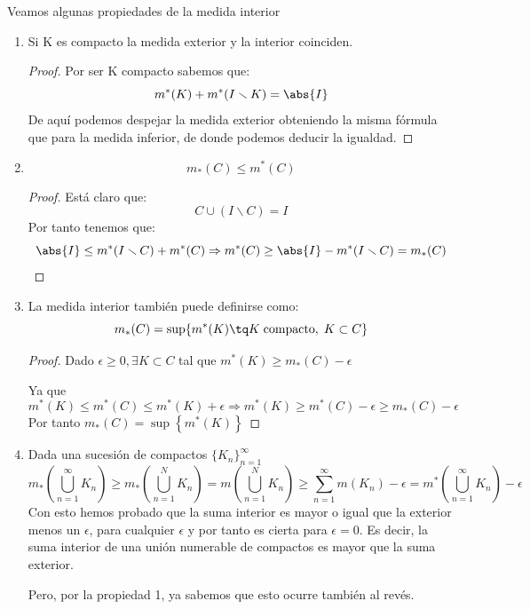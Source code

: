 \documentclass{apuntes}
\begin{document}
Veamos algunas propiedades de la medida interior
\begin{enumerate}
%
\item Si K es compacto la medida exterior y la interior coinciden.
\begin{proof}
Por ser K compacto sabemos que:
\[m^*(K) + m^*(I\smallsetminus K) = \abs{I}\]
De aquí podemos despejar la medida exterior obteniendo la misma fórmula que para la medida inferior, de donde podemos deducir la igualdad.
\end{proof}

%
\item \[m_*(C) \leq m^*(C)\]
\begin{proof}
Está claro que:
\[C \cup (I \smallsetminus C) = I\]
Por tanto tenemos que:
\[\abs{I} \leq m^*(I \smallsetminus C) + m^*(C) \Rightarrow m^*(C) \geq \abs{I} - m^*(I \smallsetminus C) = m_*(C)\]
\end{proof}

%
\item La medida interior también puede definirse como:
\[m_*(C) = \sup \lbrace  m^*(K) \tq  K\;\text{compacto},\; K \subset C \rbrace \]

\begin{proof}
Dado $\epsilon \geq 0, \exists K \subset C$ tal que $m^*(K) \geq m_*(C) - \epsilon$

Ya que
\[m^*(K) \leq m^*(C) \leq m^*(K) + \epsilon
\Rightarrow m^{*}(K) \geq m^*(C) - \epsilon \geq m_*(C) - \epsilon\]
Por tanto $m_*(C) = \sup\left\{m^*(K)\right\}$
\end{proof}

%
\item Dada una sucesión de compactos $\lbrace K_n \rbrace_{n=1}^{\infty}$
\[m_*(\bigcup_{n=1}^{\infty}K_n) \geq m_*(\bigcup_{n=1}^{N}K_n)= m(\bigcup_{n=1}^{N}K_n) \geq \sum_{n=1}^{\infty}m(K_n)-\epsilon = m^*(\bigcup_{n=1}^{\infty}K_n) - \epsilon\]
Con esto hemos probado que la suma interior es mayor o igual que la exterior menos un $\epsilon$, para cualquier $\epsilon$ y por tanto es cierta para $\epsilon = 0$. Es decir, la suma interior de una unión numerable de compactos es mayor que la suma exterior.

Pero, por la propiedad 1, ya sabemos que esto ocurre también al revés.


\end{enumerate}
\end{document}
